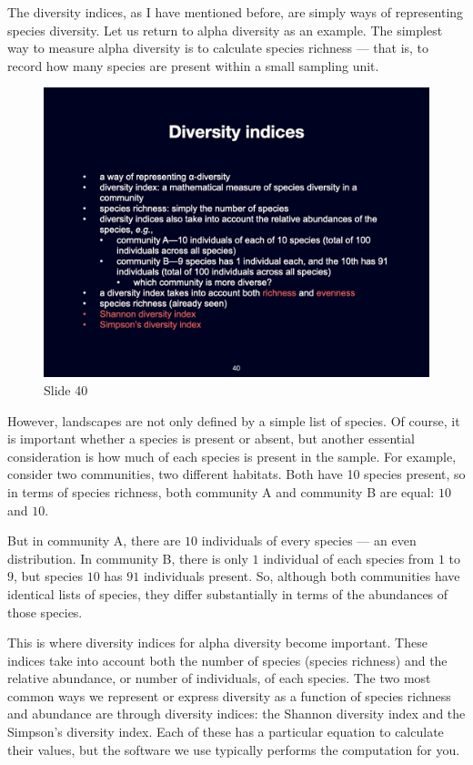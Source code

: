 \documentclass[
  10pt,
]{book}
\begin{document}
The diversity indices, as I have mentioned before, are simply ways of
representing species diversity. Let us return to alpha diversity as an
example. The simplest way to measure alpha diversity is to calculate
species richness --- that is, to record how many species are present
within a small sampling unit.

\begin{figure}[ht]
\centering
\includegraphics[width=0.8\linewidth]{../images/BDC334/BDC334-040.jpeg}
\caption*{Slide 40}
\end{figure}

However, landscapes are not only defined by a simple list of species. Of
course, it is important whether a species is present or absent, but
another essential consideration is how much of each species is present
in the sample. For example, consider two communities, two different
habitats. Both have 10 species present, so in terms of species richness,
both community A and community B are equal: \(10\) and \(10\).

But in community A, there are \(10\) individuals of every species --- an
even distribution. In community B, there is only \(1\) individual of
each species from \(1\) to \(9\), but species \(10\) has \(91\)
individuals present. So, although both communities have identical lists
of species, they differ substantially in terms of the abundances of
those species.

This is where diversity indices for alpha diversity become important.
These indices take into account both the number of species (species
richness) and the relative abundance, or number of individuals, of each
species. The two most common ways we represent or express diversity as a
function of species richness and abundance are through diversity
indices: the Shannon diversity index and the Simpson's diversity index.
Each of these has a particular equation to calculate their values, but
the software we use typically performs the computation for you.
\end{document}
